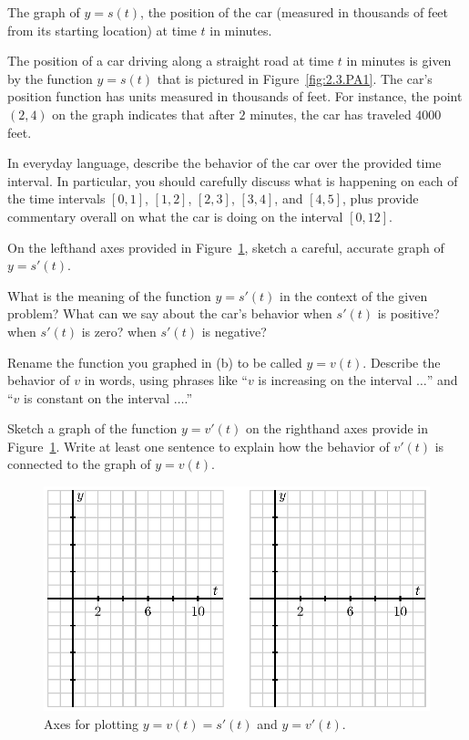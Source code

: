 \begin{marginfigure}[1cm]
\caption{The graph of $y = s(t)$, the position of the car (measured in thousands of feet from its starting location) at time $t$ in minutes.} \label{fig:2.3.PA1}
\end{marginfigure}

\begin{pa} \label{PA:2.3}
The position of a car driving along a straight road at time $t$ in minutes is given by the function $y = s(t)$ that is pictured in Figure~\ref{fig:2.3.PA1}.  The car's position function has units measured in thousands of feet.  For instance, the point $(2,4)$ on the graph indicates that after $2$ minutes, the car has traveled $4000$ feet.

\ba
	\item In everyday language, describe the behavior of the car over the provided time interval.  In particular, you should carefully discuss what is happening on each of the time intervals $[0,1]$, $[1,2]$, $[2,3]$, $[3,4]$, and $[4,5]$, plus provide commentary overall on what the car is doing on the interval $[0,12]$.
	\item On the lefthand axes provided in Figure~\ref{fig:2.3.PA1b}, sketch a careful, accurate graph of $y = s'(t)$.
	\item What is the meaning of the function $y = s'(t)$ in the context of the given problem?  What can we say about the car's behavior when $s'(t)$ is positive?  when $s'(t)$ is zero?  when $s'(t)$ is negative?
	\item Rename the function you graphed in (b) to be called $y = v(t)$.  Describe the behavior of $v$ in words, using phrases like ``$v$ is increasing on the interval $\ldots$'' and ``$v$ is constant on the interval $\ldots$.''
	\item Sketch a graph of the function $y = v'(t)$ on the righthand axes provide in Figure~\ref{fig:2.3.PA1b}.  Write at least one sentence to explain how the behavior of $v'(t)$ is connected to the graph of $y=v(t)$.
\ea

\end{pa} 

\begin{figure}
\includegraphics{figures/1_6_PA1b.eps}
\caption{Axes for plotting $y = v(t) = s'(t)$ and $y = v'(t)$.} \label{fig:2.3.PA1b}
\end{figure}

\afterpa

